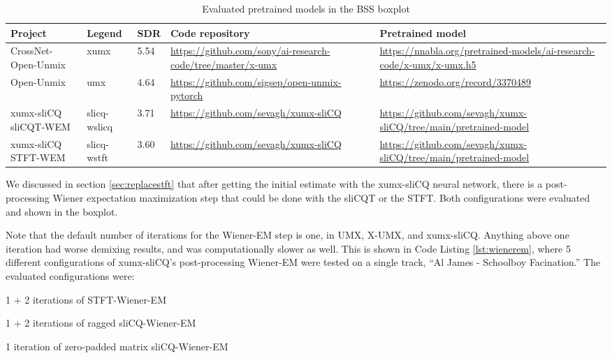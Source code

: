 \documentclass[report.tex]{subfiles}
\begin{document}
\begin{table}[ht]
	\centering
	\caption{Evaluated pretrained models in the BSS boxplot}
	\label{table:bsseval}
	\begin{tabular}{ |p{2.5cm}|l|l|p{3.5cm}|p{3.5cm}| }
	 \hline
		Project & Legend & SDR & Code repository & Pretrained model \\
	 \hline
	 \hline
		CrossNet-Open-Unmix & xumx & 5.54 & \url{https://github.com/sony/ai-research-code/tree/master/x-umx} & \url{https://nnabla.org/pretrained-models/ai-research-code/x-umx/x-umx.h5} \\
	 \hline
		Open-Unmix & umx & 4.64 & \url{https://github.com/sigsep/open-unmix-pytorch} & \url{https://zenodo.org/record/3370489} \\
	 \hline
		\makecell[l]{xumx-sliCQ \\ sliCQT-WEM} & slicq-wslicq & 3.71 & \url{https://github.com/sevagh/xumx-sliCQ} & \url{https://github.com/sevagh/xumx-sliCQ/tree/main/pretrained-model} \\
	 \hline
		\makecell[l]{xumx-sliCQ \\ STFT-WEM} & slicq-wstft & 3.60 & \url{https://github.com/sevagh/xumx-sliCQ} & \url{https://github.com/sevagh/xumx-sliCQ/tree/main/pretrained-model} \\
	 \hline
\end{tabular}
\end{table}

We discussed in section \ref{sec:replacestft} that after getting the initial estimate with the xumx-sliCQ neural network, there is a post-processing Wiener expectation maximization step that could be done with the sliCQT or the STFT. Both configurations were evaluated and shown in the boxplot.

Note that the default number of iterations for the Wiener-EM step is one, in UMX, X-UMX, and xumx-sliCQ. Anything above one iteration had worse demixing results, and was computationally slower as well. This is shown in Code Listing \ref{lst:wienerem}, where 5 different configurations of xumx-sliCQ's post-processing Wiener-EM were tested on a single track, ``Al James - Schoolboy Facination.'' The evaluated configurations were:
\begin{tight_enumerate}
	\item
		1 + 2 iterations of STFT-Wiener-EM
	\item
		1 + 2 iterations of ragged sliCQ-Wiener-EM
	\item
		1 iteration of zero-padded matrix sliCQ-Wiener-EM
\end{tight_enumerate}
\end{document}
